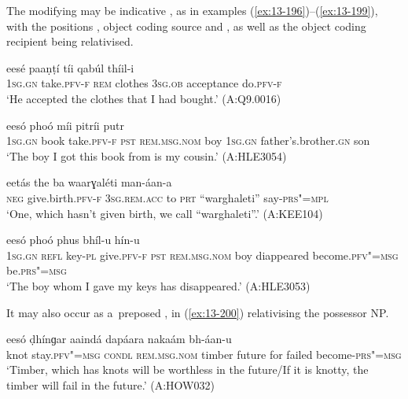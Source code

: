 The modifying  may be indicative , as in examples (\ref{ex:13-196})--(\ref{ex:13-199}), with the positions ,  object coding source and  , as well as the  object coding recipient being relativised.

\begin{exe}
\ex
\label{ex:13-196}
 eesé paaṇṭí tíi qabúl  thíil-i \\
\textsc{1sg.gn} take.\textsc{pfv-f} \textsc{rem} clothes \textsc{3sg.ob} acceptance do.\textsc{pfv-f} \\
\glt `He accepted the clothes that I had bought.' (A:Q9.0016)

\ex
\label{ex:13-197}
 eesó phoó  míi pitríi putr \\
\textsc{1sg.gn} book take.\textsc{pfv-f} \textsc{pst} \textsc{rem.msg.nom} boy  \textsc{1sg.gn} father's.brother.\textsc{gn} son \\
\glt `The boy I got this book from is my cousin.' (A:HLE3054)

\ex
\label{ex:13-198}
\gll [na ǰéel-i] eetás the ba  waarɣaléti man-áan-a \\
\textsc{neg} give.birth.\textsc{pfv-f} \textsc{3sg.rem.acc} to \textsc{prt}  ``warghaleti'' say-\textsc{prs"=mpl} \\
\glt `One, which hasn't given birth, we call ``warghaleti''.' (A:KEE104)

\ex
\label{ex:13-199}
 eesó  phoó phus bhíl-u hín-u  \\
\textsc{1sg.gn} \textsc{refl} key-\textsc{pl} give.\textsc{pfv-f} \textsc{pst} \textsc{rem.msg.nom}  boy diappeared become.\textsc{pfv"=msg} be.\textsc{prs"=msg} \\
\glt `The boy whom I gave my keys has disappeared.' (A:HLE3053) 
\end{exe}

It may also occur as a~preposed  , in (\ref{ex:13-200}) relativising the possessor NP.

\begin{exe}
\ex
\label{ex:13-200}
 eesó ḍhínɡar aaindá  dapáara nakaám bh-áan-u  \\
knot stay.\textsc{pfv"=msg} \textsc{condl} \textsc{rem.msg.nom} timber future  for failed become-\textsc{prs"=msg} \\
\glt `Timber, which has knots will be worthless in the future/If it is knotty, the timber will fail in the future.' (A:HOW032) 
\end{exe}

